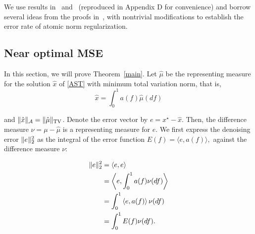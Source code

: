 We use results in~\cite{cg_noisy} and~\cite{btr12} (reproduced in Appendix D for
convenience) and borrow several ideas from the proofs in~\cite{cg_noisy}, with
nontrivial modifications to establish the error rate of atomic norm
regularization.

\subsection{Near optimal MSE}

In this section, we will prove Theorem~\ref{main}. Let $\hat{\mu}$ be the
representing measure for the solution $\hat{x}$ of \eqref{AST} with
minimum total variation norm, that is,
\[
\hat{x} = \int_0^1 a(f) \hat{\mu}(df)
\]

and $\lVert\hat{x}\rVert_{\mathcal{A}} = \lVert\hat{\mu}\rVert_{\mathrm{TV}}$. Denote the error
vector by $e = x^\star - \hat{x}$. Then, the difference measure $\nu = \mu -
\hat{\mu}$ is a representing measure for $e$. We first express the denoising
error $\lVert e\rVert_2^2$ as the integral of the error function $E(f) = \langle e,
a(f) \rangle,$ against the difference measure $\nu$:

\begin{align*}
\lVert e\rVert_2^2 &= \langle e, e \rangle\\
& = \left\langle e, \int_0^1 a(f) \nu(df) \right\rangle\\
& =  \int_0^1  \left\langle e,a(f) \right\rangle \nu(df)\\
& = \int_0^1 E(f) \nu(df).
\end{align*}


